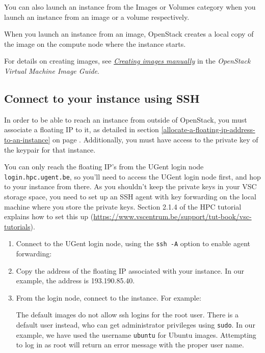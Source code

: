 You can also launch an instance from the Images or Volumes category when
you launch an instance from an image or a volume respectively.

When you launch an instance from an image, OpenStack creates a local
copy of the image on the compute node where the instance starts.

For details on creating images, see
\href{https://docs.openstack.org/image-guide/create-images-manually.html}{\emph{Creating
images manually}} in the \emph{OpenStack Virtual Machine Image Guide}.

\subsection*{Connect to your instance using SSH}\label{connect-to-your-instance-using-ssh}

In order to be able to reach an instance from outside of OpenStack,
you must associate a floating IP to it, as detailed in section
\ref{allocate-a-floating-ip-address-to-an-instance} on page
\pageref{allocate-a-floating-ip-address-to-an-instance}.
Additionally, you must have access to the private key of the keypair
for that instance.

You can only reach the floating IP's from the UGent login node
\lstinline{login.hpc.ugent.be}, so you'll need to access the UGent
login node first, and hop to your instance from there.  As you
shouldn't keep the private keys in your VSC storage space, you need to
set up an SSH agent with key forwarding on the local machine where you store the private keys.  Section 2.1.4 of the HPC tutorial explains how to set this up (\url{https://www.vscentrum.be/support/tut-book/vsc-tutorials}).

\begin{enumerate}
\item Connect to the UGent login node, using the \lstinline{ssh -A} option
  to enable agent forwarding:

  \begin{prompt}
  \end{prompt}

\item Copy the address of the floating IP associated with your
  instance.  In our example, the address is 193.190.85.40.

\item From the login node, connect to the instance. For example:

  \begin{prompt}
  \end{prompt}

  The default images do not allow ssh logins for the root user.  There
  is a default user instead, who can get administrator privileges
  using \lstinline{sudo}.  In our example, we have used the username
  \lstinline{ubuntu} for Ubuntu images.  Attempting to log in as root
  will return an error message with the proper user name.
\end{enumerate}

